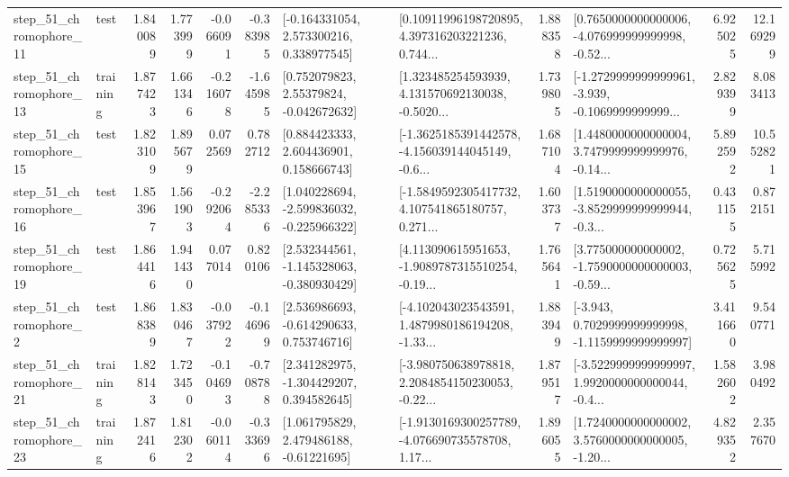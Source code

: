 \begin{tabular}{llrrrrllrlrr}
   step\_51\_chromophore\_11 &      test &      1.840089 &    1.773999 &     -0.066091 & -0.383985 &    [-0.164331054, 2.573300216, 0.338977545] &  [0.10911996198720895, 4.397316203221236, 0.744... &       1.888358 &  [0.7650000000000006, -4.076999999999998, -0.52... &            6.925025 &         12.169299 \\
   step\_51\_chromophore\_13 &  training &      1.877423 &    1.661346 &     -0.216078 & -1.645985 &     [0.752079823, 2.55379824, -0.042672632] &  [1.323485254593939, 4.131570692130038, -0.5020... &       1.739805 &  [-1.2729999999999961, -3.939, -0.1069999999999... &            2.829399 &          8.083413 \\
   step\_51\_chromophore\_15 &      test &      1.823109 &    1.895679 &      0.072569 &  0.782712 &     [0.884423333, 2.604436901, 0.158666743] &  [-1.3625185391442578, -4.156039144045149, -0.6... &       1.687104 &  [1.4480000000000004, 3.7479999999999976, -0.14... &            5.892592 &         10.552821 \\
   step\_51\_chromophore\_16 &      test &      1.853967 &    1.561903 &     -0.292064 & -2.285336 &   [1.040228694, -2.599836032, -0.225966322] &  [-1.5849592305417732, 4.107541865180757, 0.271... &       1.603737 &  [1.5190000000000055, -3.8529999999999944, -0.3... &            0.431155 &          0.872151 \\
   step\_51\_chromophore\_19 &      test &      1.864416 &    1.941430 &      0.077014 &  0.820106 &   [2.532344561, -1.145328063, -0.380930429] &  [4.113090615951653, -1.9089787315510254, -0.19... &       1.765641 &  [3.775000000000002, -1.7590000000000003, -0.59... &            0.725625 &          5.715992 \\
    step\_51\_chromophore\_2 &      test &      1.868389 &    1.830467 &     -0.037922 & -0.146969 &    [2.536986693, -0.614290633, 0.753746716] &  [-4.102043023543591, 1.4879980186194208, -1.33... &       1.883949 &  [-3.943, 0.7029999999999998, -1.1159999999999997] &            3.411660 &          9.540771 \\
   step\_51\_chromophore\_21 &  training &      1.828143 &    1.723450 &     -0.104693 & -0.708788 &    [2.341282975, -1.304429207, 0.394582645] &  [-3.980750638978818, 2.2084854150230053, -0.22... &       1.879517 &  [-3.5229999999999997, 1.9920000000000044, -0.4... &            1.582602 &          3.980492 \\
   step\_51\_chromophore\_23 &  training &      1.872416 &    1.812302 &     -0.060114 & -0.333696 &     [1.061795829, 2.479486188, -0.61221695] &  [-1.9130169300257789, -4.076690735578708, 1.17... &       1.896055 &  [1.7240000000000002, 3.5760000000000005, -1.20... &            4.829352 &          2.357670 \\

\end{tabular}
